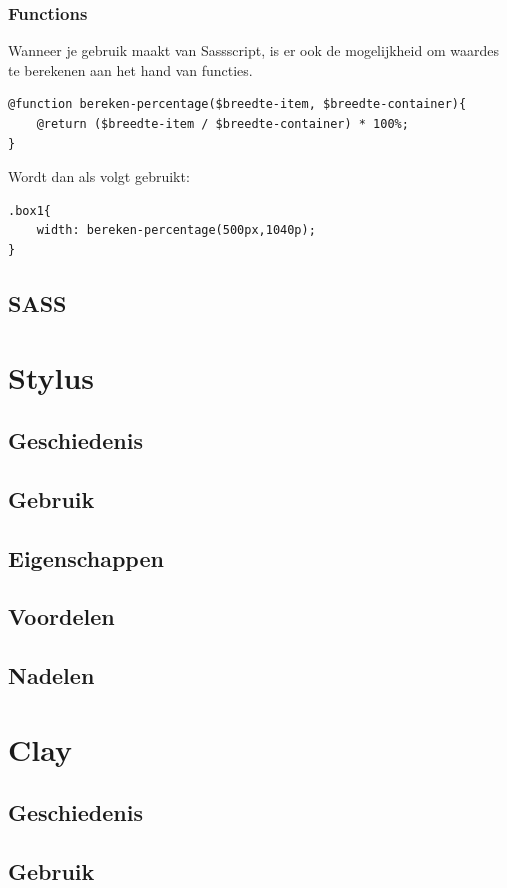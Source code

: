 \documentclass[pdftex,a4paper,12pt,twoside]{report}
\begin{document}
\subsubsection{Functions}
Wanneer je gebruik maakt van Sassscript, is er ook de mogelijkheid om waardes te berekenen aan het hand van functies.
\begin{lstlisting}
@function bereken-percentage($breedte-item, $breedte-container){
	@return ($breedte-item / $breedte-container) * 100%;
}
\end{lstlisting}
Wordt dan als volgt gebruikt:
\begin{lstlisting}
.box1{
	width: bereken-percentage(500px,1040p);
}
\end{lstlisting}

\subsection{SASS}

\section{Stylus}
\subsection{Geschiedenis}
\subsection{Gebruik}
\subsection{Eigenschappen}
\subsection{Voordelen}
\subsection{Nadelen}



\section{Clay}
\subsection{Geschiedenis}
\subsection{Gebruik}
\end{document}
